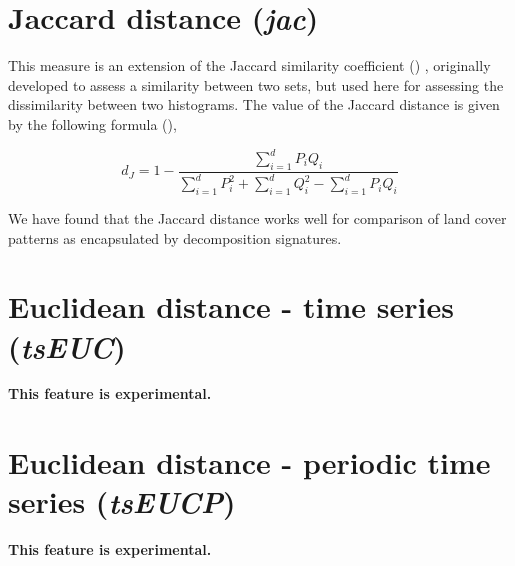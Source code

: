 

\section{Jaccard distance ({\it jac})}

This measure is an extension of the Jaccard similarity coefficient (\cite{Jaccard1908})
, originally developed to assess a similarity between two sets, but used here for assessing the dissimilarity between two histograms. 
The value of the Jaccard distance is given by the following formula (\cite{Cha2007}),

\begin{equation} \label{eq:Jaccard}
d_J= 1-\dfrac
{\sum\limits_{i=1}^{d} P_i Q_i}
{\sum\limits_{i=1}^{d} P_i^2 + \sum\limits_{i=1}^{d} Q_i^2 - \sum\limits_{i=1}^{d} P_i Q_i}
\end{equation}

\noindent We have found that the Jaccard distance works well for comparison of land cover patterns as encapsulated by decomposition signatures.





\section{Euclidean distance - time series ({\it tsEUC})}
\textbf{This feature is experimental.}

\section{Euclidean distance - periodic time series ({\it tsEUCP})}
\textbf{This feature is experimental.}

